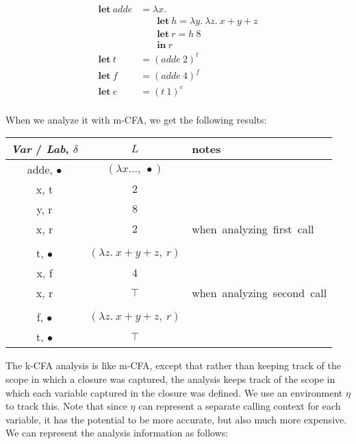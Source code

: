 \documentclass[11pt]{article}
\begin{document}
\[
\begin{array}{ll}
\textbf{let}~ \textit{adde} & = \lambda x .\\
                            & ~~~~~~~~ \textbf{let}~ h = \lambda y .~ \lambda z .~ x + y + z\\
                            & ~~~~~~~~ \textbf{let}~ r = h~ 8\\
                            & ~~~~~~~~ \textbf{in}~ r\\
\textbf{let}~ \textit{t} & = (adde~ 2)^{t}\\
\textbf{let}~ \textit{f} & = (adde~ 4)^{f}\\
\textbf{let}~ \textit{e} & = (t~ 1)^{e}\\
\end{array}
\]

When we analyze it with m-CFA, we get the following results:

\tablespace
\begin{tabular}{c | c | l}

\textit{Var} / \textit{Lab}, $\delta$ & $L$ & notes \\
\hline
adde, $\bullet$ & $(\lambda x...,~ \bullet)$ \\
x, t            & $2$ \\
y, r            & $8$ \\
x, r            & $2$ & \mbox{when analyzing first call} \\\\
t, $\bullet$    & $(\lambda z .~ x + y + z,~r)$ \\
x, f            & $4$ \\
x, r            & $\top$ & \mbox{when analyzing second call} \\\\
f, $\bullet$    & $(\lambda z .~ x + y + z,~r)$ \\
t, $\bullet$    & $\top$ \\

\end{tabular}
\tablespace

The k-CFA analysis is like m-CFA, except that rather than keeping track of the
scope in which a closure was captured, the analysis keeps track of the scope in
which each variable captured in the closure was defined. We use an environment
$\eta$ to track this. Note that since $\eta$ can represent a separate calling
context for each variable, it has the potential to be more accurate, but also
much more expensive. We can represent the analysis information as follows:
\end{document}
